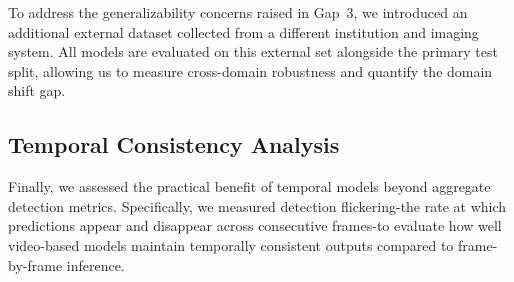 \documentclass{article}
\begin{document}
To address the generalizability concerns raised in Gap~3, we introduced an additional external dataset collected from a different institution and imaging system. All models are evaluated on this external set alongside the primary test split, allowing us to measure cross-domain robustness and quantify the domain shift gap.

\subsection{Temporal Consistency Analysis}

Finally, we assessed the practical benefit of temporal models beyond aggregate detection metrics. Specifically, we measured detection flickering-the rate at which predictions appear and disappear across consecutive frames-to evaluate how well video-based models maintain temporally consistent outputs compared to frame-by-frame inference.



\end{document}
